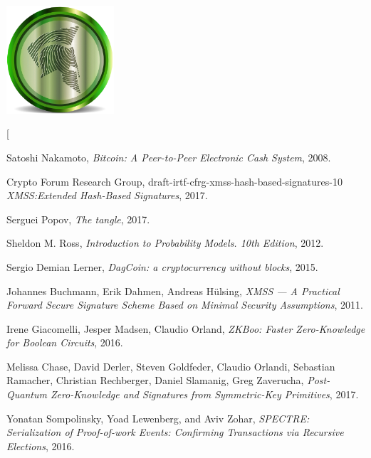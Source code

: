\documentclass[a4paper,10pt,twocolumn]{article}
\begin{document}
	\vspace{3cm}
	
	\begin{center}
	\includegraphics[width=40mm]{logo-min}\\[\bigskipamount]
	\end{center}
	
	  \twocolumn[
		\begin{@twocolumnfalse}
	
	
	  \begin{thebibliography}{99}
		
			Satoshi Nakamoto,
			\emph{Bitcoin: A Peer-to-Peer Electronic Cash System}, 2008.
		
		Crypto Forum Research Group, draft-irtf-cfrg-xmss-hash-based-signatures-10
			\emph{XMSS:Extended Hash-Based Signatures}, 2017.
			
		Serguei Popov,
			\emph{The tangle}, 2017.
		
		Sheldon M. Ross,
			\emph{Introduction to Probability Models. 10th Edition}, 2012.
		
		Sergio Demian Lerner,
			\emph{DagCoin: a cryptocurrency without blocks}, 2015.
		
		Johannes Buchmann, Erik Dahmen, Andreas H\"ulsing,
			\emph{XMSS --- A Practical Forward Secure Signature Scheme Based on Minimal Security Assumptions}, 2011.
		
		Irene Giacomelli, Jesper Madsen, Claudio Orland,
			\emph{ZKBoo: Faster Zero-Knowledge for Boolean Circuits}, 2016.
			
		Melissa Chase, David Derler, Steven Goldfeder, Claudio Orlandi, Sebastian Ramacher, Christian Rechberger, Daniel Slamanig, Greg Zaverucha,
			\emph{Post-Quantum Zero-Knowledge and Signatures from Symmetric-Key Primitives}, 2017.
			
		Yonatan Sompolinsky, Yoad Lewenberg, and Aviv Zohar, 
			\emph{SPECTRE\@:	Serialization of Proof-of-work Events: Confirming Transactions via Recursive Elections}, 2016.
		

\end{thebibliography}
\end{@twocolumnfalse}
\end{document}
